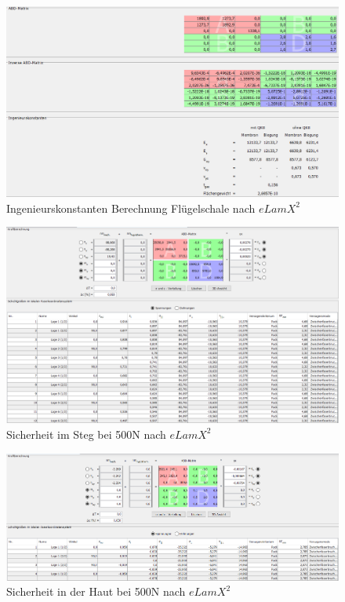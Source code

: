 \begin{figure}[h]
	\includegraphics[width=1.0\textwidth]{Bilder/Konstanten Haut.png}
	\caption{Ingenieurskonstanten Berechnung Flügelschale nach $eLamX^{2}$}
	\label{fig:Ingenieurskonstanten Haut}
\end{figure}
\begin{figure}[h]
	\centering
	\includegraphics[width=1\textwidth]{Bilder/sicher1}
	\caption{Sicherheit im Steg bei 500N nach $eLamX^{2}$}
	\label{sicher-steg}
\end{figure}
\begin{figure}[h]
	\centering
	\includegraphics[width=1\textwidth]{Bilder/sicher2}
	\caption{Sicherheit in der Haut bei 500N nach $eLamX^{2}$}
\end{figure}
